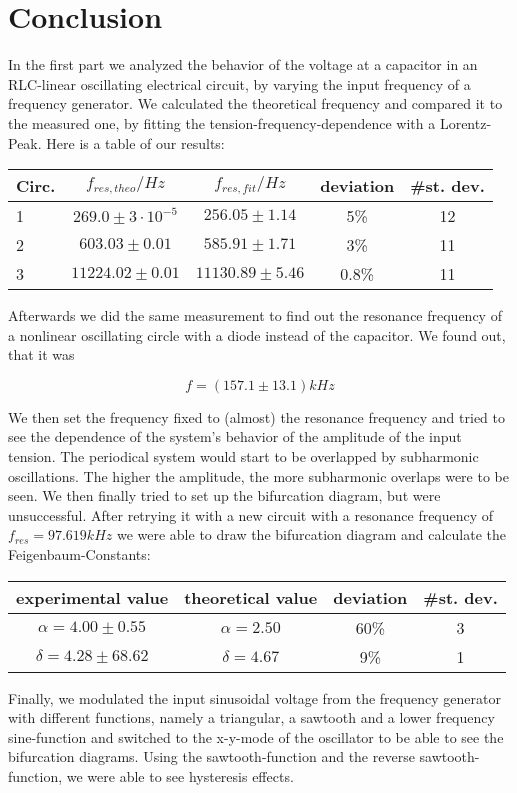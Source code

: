 \clearpage
\section{Conclusion}

In the first part we analyzed the behavior of the voltage at a capacitor in an RLC-linear oscillating electrical circuit, by varying the input frequency of a frequency generator. We calculated the theoretical frequency and compared it to the measured one, by fitting the tension-frequency-dependence with a Lorentz-Peak. Here is a table of our results:

\begin{center}
\begin{tabular}{l c c c c}
Circ. & $f_{res,theo}/Hz$ & $f_{res,fit}/Hz$ & deviation & \#st. dev.\\ \hline
1 & $269.0\pm 3\cdot10^{-5}$ & $256.05\pm1.14$ & 5\% & 12\\
2 & $603.03\pm0.01$ & $585.91\pm1.71$ & 3\% & 11\\
3 & $11224.02\pm0.01$ & $11130.89\pm5.46$ & 0.8\% & 11\\
\end{tabular}
\end{center}

Afterwards we did the same measurement to find out the resonance frequency of a nonlinear oscillating circle with a diode instead of the capacitor. We found out, that it was 

$$f=(157.1\pm13.1)kHz$$

We then set the frequency fixed to (almost) the resonance frequency and tried to see the dependence of the system's behavior of the amplitude of the input tension. The periodical system would start to be overlapped by subharmonic oscillations. The higher the amplitude, the more subharmonic overlaps were to be seen. We then finally tried to set up the bifurcation diagram, but were unsuccessful. After retrying it with a new circuit with a resonance frequency of $f_{res}=97.619 kHz$ we were able to draw the bifurcation diagram and calculate the Feigenbaum-Constants:

\begin{center}
\begin{tabular}{c c c c}
experimental value & theoretical value & deviation & \#st. dev.\\ \hline
$\alpha = 4.00\pm0.55 $ & $\alpha = 2.50$ & 60\% & 3\\
$\delta = 4.28 \pm68.62$ & $\delta = 4.67$ & 9\% & 1\\
\end{tabular}
\end{center}

Finally, we modulated the input sinusoidal voltage from the frequency generator with different functions, namely a triangular, a sawtooth and a lower frequency sine-function and switched to the x-y-mode of the oscillator to be able to see the bifurcation diagrams. Using the sawtooth-function and the reverse sawtooth-function, we were able to see hysteresis effects.